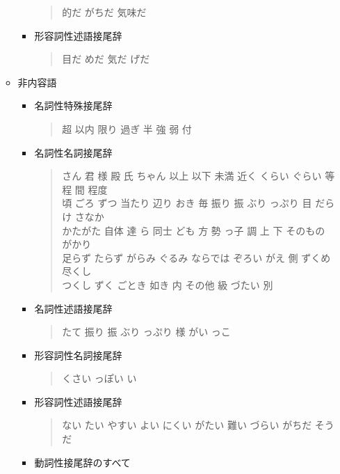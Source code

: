 \documentclass[a4j]{jarticle}
\begin{document}
\begin{itemize}
\begin{itemize}
\begin{itemize}
\begin{quote}
		      的だ がちだ 気味だ
		     \end{quote}
	       \item 形容詞性述語接尾辞
		     \begin{quote}
		      目だ めだ 気だ げだ
		     \end{quote}
     	      \end{itemize}
	\item 非内容語
	      \begin{itemize}
	       \item 名詞性特殊接尾辞
		     \begin{quote}
		      超 以内 限り 過ぎ 半 強 弱 付
		     \end{quote}
	       \item 名詞性名詞接尾辞
		     \begin{quote}
		      さん 君 様 殿 氏 ちゃん 以上 以下 未満 近く くらい ぐらい 等 程 間 程度 \\ 頃 ごろ ずつ 当たり 辺り おき 毎 振り 振 ぶり っぷり 目 だらけ さなか \\ かたがた 自体 達 ら 同士 ども 方 勢 っ子 調 上 下 そのもの がかり \\ 足らず たらず がらみ ぐるみ ならでは ぞろい がえ 側 ずくめ 尽くし \\ つくし ずく ごとき 如き 内 その他 級 づたい 別
		     \end{quote}
	       \item 名詞性述語接尾辞
		     \begin{quote}
		      たて 振り 振 ぶり っぷり 様 がい っこ
		     \end{quote}
	       \item 形容詞性名詞接尾辞
		     \begin{quote}
		      くさい っぽい い
		     \end{quote}
     	       \item 形容詞性述語接尾辞
		     \begin{quote}
		      ない たい やすい よい にくい がたい 難い づらい がちだ そうだ
		     \end{quote}
	       \item 動詞性接尾辞のすべて
	      \end{itemize}
       \end{itemize}
\end{itemize}


\end{document}
